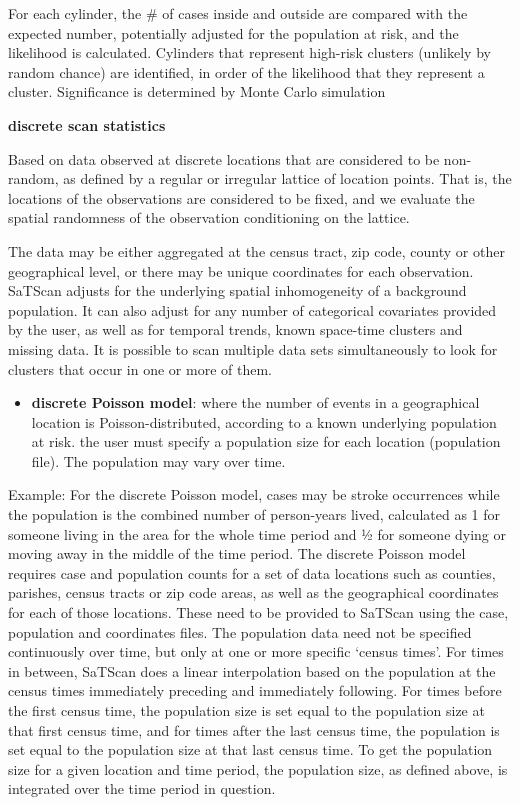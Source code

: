\documentclass[
]{article}
\providecommand{\tightlist}{%
  \setlength{\itemsep}{0pt}\setlength{\parskip}{0pt}}
\begin{document}
For each cylinder, the \# of cases inside and outside are compared with
the expected number, potentially adjusted for the population at risk,
and the likelihood is calculated. Cylinders that represent high-risk
clusters (unlikely by random chance) are identified, in order of the
likelihood that they represent a cluster. Significance is determined by
Monte Carlo simulation

\textbf{discrete scan statistics}

Based on data observed at discrete locations that are considered to be
non-random, as defined by a regular or irregular lattice of location
points. That is, the locations of the observations are considered to be
fixed, and we evaluate the spatial randomness of the observation
conditioning on the lattice.

The data may be either aggregated at the census tract, zip code, county
or other geographical level, or there may be unique coordinates for each
observation. SaTScan adjusts for the underlying spatial inhomogeneity of
a background population. It can also adjust for any number of
categorical covariates provided by the user, as well as for temporal
trends, known space-time clusters and missing data. It is possible to
scan multiple data sets simultaneously to look for clusters that occur
in one or more of them.

\begin{itemize}
\tightlist
\item
  \textbf{discrete Poisson model}: where the number of events in a
  geographical location is Poisson-distributed, according to a known
  underlying population at risk. the user must specify a population size
  for each location (population file). The population may vary over
  time.
\end{itemize}

Example: For the discrete Poisson model, cases may be stroke occurrences
while the population is the combined number of person-years lived,
calculated as 1 for someone living in the area for the whole time period
and 1⁄2 for someone dying or moving away in the middle of the time
period. The discrete Poisson model requires case and population counts
for a set of data locations such as counties, parishes, census tracts or
zip code areas, as well as the geographical coordinates for each of
those locations. These need to be provided to SaTScan using the case,
population and coordinates files. The population data need not be
specified continuously over time, but only at one or more specific
`census times'. For times in between, SaTScan does a linear
interpolation based on the population at the census times immediately
preceding and immediately following. For times before the first census
time, the population size is set equal to the population size at that
first census time, and for times after the last census time, the
population is set equal to the population size at that last census time.
To get the population size for a given location and time period, the
population size, as defined above, is integrated over the time period in
question.
\end{document}

